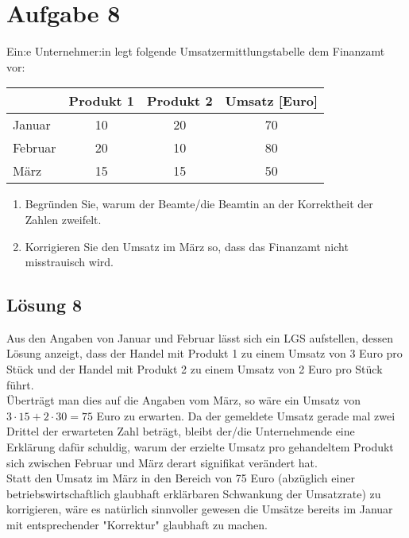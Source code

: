 \documentclass[main.tex]{subfiles}
\begin{document}
\section{Aufgabe 8}
Ein:e Unternehmer:in legt folgende Umsatzermittlungstabelle dem Finanzamt vor:

\begin{center}        
    \begin{tabular}{ p{2cm}|c|c|c }
        & Produkt 1 & Produkt 2 & Umsatz [Euro] \\
        \hline
        Januar & 10 & 20 & 70 \\
        Februar & 20 & 10 & 80 \\
        März & 15 & 15 & 50 \\
    \end{tabular}
\end{center}

\begin{enumerate}
    \item Begründen Sie, warum der Beamte/die Beamtin an der Korrektheit der Zahlen zweifelt.
    \item Korrigieren Sie den Umsatz im März so, dass das Finanzamt nicht misstrauisch wird. 
\end{enumerate}

\subsection{Lösung 8}
Aus den Angaben von Januar und Februar lässt sich ein LGS aufstellen, dessen Lösung anzeigt, dass der Handel mit Produkt 1 zu einem Umsatz von 3 Euro pro Stück und der Handel mit Produkt 2 zu einem Umsatz von 2 Euro pro Stück führt. \\

Überträgt man dies auf die Angaben vom März, so wäre ein Umsatz von $3\cdot 15 + 2\cdot 30 = 75$ Euro zu erwarten. Da der gemeldete Umsatz gerade mal zwei Drittel der erwarteten Zahl beträgt, bleibt der/die Unternehmende eine Erklärung dafür schuldig, warum der erzielte Umsatz pro gehandeltem Produkt sich zwischen Februar und März derart signifikat verändert hat.\\

Statt den Umsatz im März in den Bereich von 75 Euro (abzüglich einer betriebswirtschaftlich glaubhaft erklärbaren Schwankung der Umsatzrate) zu korrigieren, wäre es natürlich sinnvoller gewesen die Umsätze bereits im Januar mit entsprechender "Korrektur" glaubhaft zu machen.
\end{document}
